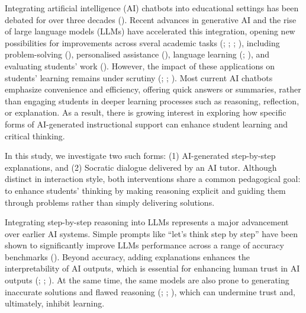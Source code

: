 \documentclass[
  11pt,
]{article}
\begin{document}
Integrating artificial intelligence (AI) chatbots into educational settings has been debated for over three decades (). Recent advances in generative AI and the rise of large language models (LLMs) have accelerated this integration, opening new possibilities for improvements across sveral academic tasks (; ; ; ), including problem-solving (), personalised assistance (), language learning (; ), and evaluating students' work (). However, the impact of these applications on students' learning remains under scrutiny (; ; ). Most current AI chatbots emphasize convenience and efficiency, offering quick answers or summaries, rather than engaging students in deeper learning processes such as reasoning, reflection, or explanation. As a result, there is growing interest in exploring how specific forms of AI-generated instructional support can enhance student learning and critical thinking.

In this study, we investigate two such forms: (1) AI-generated step-by-step explanations, and (2) Socratic dialogue delivered by an AI tutor. Although distinct in interaction style, both interventions share a common pedagogical goal: to enhance students' thinking by making reasoning explicit and guiding them through problems rather than simply delivering solutions.

Integrating step-by-step reasoning into LLMs represents a major advancement over earlier AI systems. Simple prompts like ``let's think step by step'' have been shown to significantly improve LLMs performance across a range of accuracy benchmarks (). Beyond accuracy, adding explanations enhances the interpretability of AI outputs, which is essential for enhancing human trust in AI outputs (; ; ). At the same time, the same models are also prone to generating inaccurate solutions and flawed reasoning (; ; ), which can undermine trust and, ultimately, inhibit learning.
\end{document}
